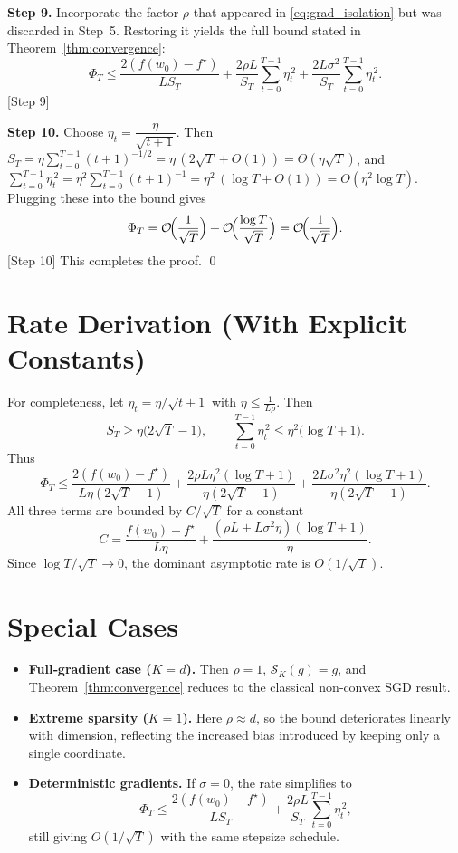 \documentclass{article}
\newcommand{\topk}[1]{\mathcal{S}_K(#1)}
\begin{document}
\noindent\textbf{Step 9.} Incorporate the factor $\rho$ that appeared in
\eqref{eq:grad_isolation} but was discarded in Step~5. Restoring it yields the
full bound stated in Theorem~\ref{thm:convergence}:
\[
\Phi_T
\le
\frac{2(f(w_0)-f^\star)}{L S_T}
   +\frac{2\rho L}{S_T}\sum_{t=0}^{T-1}\eta_t^{\,2}
   +\frac{2L\sigma^2}{S_T}\sum_{t=0}^{T-1}\eta_t^{\,2}.
\]
[Step 9]

\noindent\textbf{Step 10.} Choose $\eta_t=\dfrac{\eta}{\sqrt{t+1}}$.
Then $S_T = \eta\sum_{t=0}^{T-1}(t+1)^{-1/2}
      = \eta\,(2\sqrt{T}+O(1)) = \Theta(\eta\sqrt{T})$,
and $\sum_{t=0}^{T-1}\eta_t^{\,2}
      = \eta^{2}\sum_{t=0}^{T-1}(t+1)^{-1}
      = \eta^{2}\,( \log T + O(1) ) = O(\eta^{2}\log T)$.
Plugging these into the bound gives
\[
\Phi_T = \mathcal{O}\!\Bigl(\frac{1}{\sqrt{T}}\Bigr)
      + \mathcal{O}\!\Bigl(\frac{\log T}{\sqrt{T}}\Bigr)
      = \mathcal{O}\!\Bigl(\frac{1}{\sqrt{T}}\Bigr).
\]
[Step 10] This completes the proof. \qed

\section*{Rate Derivation (With Explicit Constants)}
For completeness, let $\eta_t=\eta/\sqrt{t+1}$ with $\eta\le \frac{1}{L\rho}$.
Then
\[
S_T \ge \eta\bigl(2\sqrt{T}-1\bigr),\qquad
\sum_{t=0}^{T-1}\eta_t^{\,2}\le \eta^{2}\bigl(\log T +1\bigr).
\]
Thus
\[
\Phi_T
\le
\frac{2(f(w_0)-f^\star)}{L\eta(2\sqrt{T}-1)}
   +\frac{2\rho L\eta^{2}(\log T+1)}{\eta(2\sqrt{T}-1)}
   +\frac{2L\sigma^{2}\eta^{2}(\log T+1)}{\eta(2\sqrt{T}-1)}.
\]
All three terms are bounded by $C/\sqrt{T}$ for a constant
\[
C = \frac{f(w_0)-f^\star}{L\eta}
    +\frac{(\rho L + L\sigma^{2}\eta)(\log T+1)}{\eta}.
\]
Since $\log T / \sqrt{T}\to0$, the dominant asymptotic rate is $O(1/\sqrt{T})$.

\section*{Special Cases}
\begin{itemize}[leftmargin=*]
\item \textbf{Full‑gradient case ($K=d$).}
Then $\rho=1$, $\topk{g}=g$, and Theorem~\ref{thm:convergence}
reduces to the classical non‑convex SGD result.
\item \textbf{Extreme sparsity ($K=1$).}
Here $\rho\approx d$, so the bound deteriorates linearly with dimension,
reflecting the increased bias introduced by keeping only a single coordinate.
\item \textbf{Deterministic gradients.}
If $\sigma=0$, the rate simplifies to
\[
\Phi_T \le \frac{2(f(w_0)-f^\star)}{L S_T}
          +\frac{2\rho L}{S_T}\sum_{t=0}^{T-1}\eta_t^{\,2},
\]
still giving $O(1/\sqrt{T})$ with the same stepsize schedule.
\end{itemize}
\end{document}
